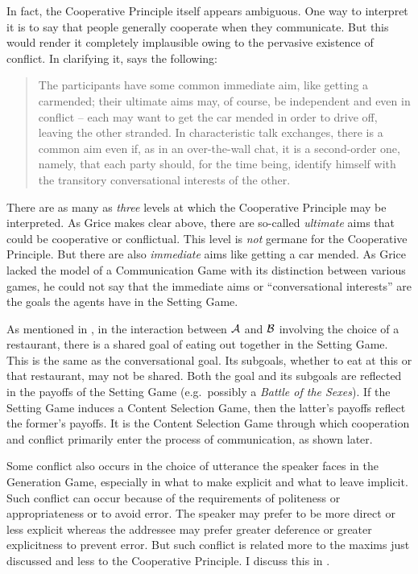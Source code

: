 In fact, the Cooperative Principle itself appears ambiguous. One way to interpret it is to say that people generally cooperate when they communicate. But this would render it completely implausible owing to the pervasive existence of conflict. In clarifying it, \citet[29]{grice:landc} says the following: 

\begin{quote}
The participants have some common immediate aim, like getting a car\linebreak mended; their ultimate aims may, of course, be independent and even in conflict -- each may want to get the car mended in order to drive off, leaving the other stranded. In characteristic talk exchanges, there is a common aim even if, as in an over-the-wall chat, it is a second-order one, namely, that each party should, for the time being, identify himself with the transitory conversational interests of the other.
\end{quote}

There are as many as \emph{three} levels at which the Cooperative Principle may be interpreted. As Grice makes clear above, there are so-called \emph{ultimate} aims that could be cooperative or conflictual. This level is \emph{not} germane for the Cooperative Principle. But there are also \emph{immediate} aims like getting a car mended. As Grice lacked the model of a Communication Game with its distinction between various games, he could not say that the immediate aims or ``conversational interests''  are the goals the agents have in the Setting Game. 

As mentioned in , in the interaction between $\cal A$ and $\cal B$ involving the choice of a restaurant, there is a shared goal of eating out together in the Setting Game. This is the same as the conversational goal. Its subgoals, whether to eat at this or that restaurant, may not be shared. Both the goal and its subgoals are reflected in the payoffs of the Setting Game (e.g.\ possibly a \emph{Battle of the Sexes}). If the Setting Game induces a Content Selection Game, then the latter's payoffs reflect the former's payoffs. It is the Content Selection Game through which cooperation and conflict primarily enter the process of communication, as shown later.

Some conflict also occurs in the choice of utterance the speaker faces in the Generation Game, especially in what to make explicit and what to leave implicit. Such conflict can occur because of the requirements of politeness or appropriateness or to avoid error. The speaker may prefer to be more direct or less explicit whereas the addressee may prefer greater deference or greater explicitness to prevent error. But such conflict is related more to the maxims just discussed and less to the Cooperative Principle. I discuss this in .

